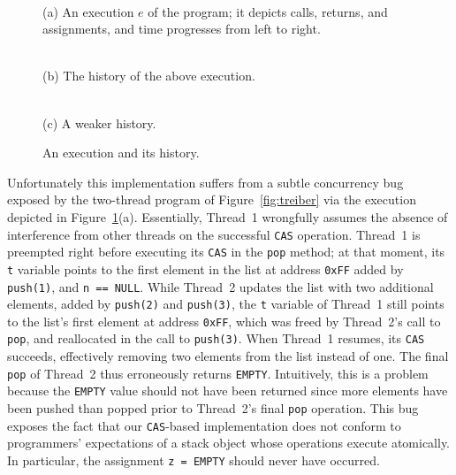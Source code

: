 \begin{figure}[t]
  \footnotesize
  \centering
   \\
  \smallskip
  \parbox{0.8\linewidth}{(a) An execution $e$ of the program; it depicts calls,
  returns, and assignments, and time progresses from left to right.}

  \bigskip
  \begin{minipage}{45mm}
     \\
    (b) The history of the above execution.
  \end{minipage}
  \hfill
  \begin{minipage}{35mm}
     \\
    (c) A weaker history.
  \end{minipage}

  \caption{An execution and its history.}
  \label{fig:stacks}
\end{figure}

Unfortunately this implementation suffers from a subtle concurrency
bug~\cite{tr/ibm/Michael04} exposed by the two-thread program of
Figure~\ref{fig:treiber} via the execution depicted in
Figure~\ref{fig:stacks}(a). Essentially, Thread~1 wrongfully assumes the
absence of interference from other threads on the successful {\tt CAS}
operation. Thread~1 is preempted right before executing its {\tt CAS} in the
{\tt pop} method; at that moment, its {\tt t} variable points to the first
element in the list at address {\tt 0xFF} added by {\tt push(1)}, and {\tt n ==
NULL}. While Thread~2 updates the list with two additional elements, added by
{\tt push(2)} and {\tt push(3)}, the {\tt t} variable of Thread~1 still points
to the list's first element at address {\tt 0xFF}, which was freed by
Thread~2's call to {\tt pop}, and reallocated in the call to {\tt push(3)}.
When Thread~1 resumes, its {\tt CAS} succeeds, effectively removing two
elements from the list instead of one. The final {\tt pop} of Thread~2 thus
erroneously returns {\tt EMPTY}. Intuitively, this is a problem because the
{\tt EMPTY} value should not have been returned since more elements have been
pushed than popped prior to Thread~2's final {\tt pop} operation. This bug
exposes the fact that our {\tt CAS}-based implementation does not conform to
programmers' expectations of a stack object whose operations execute
atomically. In particular, the assignment {\tt z = EMPTY} should never have
occurred.

